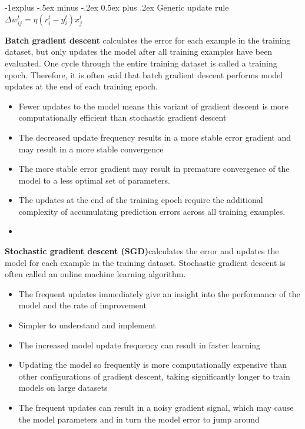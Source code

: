 \documentclass[10pt,letterpaper]{article}
\makeatletter
\renewcommand{\subsection}{\@startsection{subsection}{2}{0mm}%
                                {-1explus -.5ex minus -.2ex}%
                                {0.5ex plus .2ex}%
                                {\normalfont\normalsize\bfseries}}
\makeatother
\begin{document}
\begin{multicols}{3}
\subsection{Generic update rule}
$\Delta w_{ij}^t = \eta (r_i^t - y_i^t)x_j^t$

\textbf{Batch gradient descent} calculates the error for each example in the training dataset, but only updates the model after all training examples have been evaluated.
    One cycle through the entire training dataset is called a training epoch. Therefore, it is often said that batch gradient descent performs model updates at the end of each training epoch.
    
\begin{itemize}
    \item Fewer updates to the model means this variant of gradient descent is more computationally efficient than stochastic gradient descent
    \item The decreased update frequency results in a more stable error gradient and may result in a more stable convergence
    \item The more stable error gradient may result in premature convergence of the model to a less optimal set of parameters.
    \item The updates at the end of the training epoch require the additional complexity of accumulating prediction errors across all training examples.
    \item 
\end{itemize}

\textbf{Stochastic gradient descent (SGD)}calculates the error and updates the model for each example in the training dataset.
	Stochastic gradient descent is often called an online machine learning algorithm.
\begin{itemize}
	\item The frequent updates immediately give an insight into the performance of the model and the rate of improvement
	\item Simpler to understand and implement
	\item The increased model update frequency can result in faster learning
	\item Updating the model so frequently is more computationally expensive than other configurations of gradient descent, taking significantly longer to train models on large datasets
	\item The frequent updates can result in a noisy gradient signal, which may cause the model parameters and in turn the model error to jump around
\end{itemize}


\end{multicols}
\end{document}
